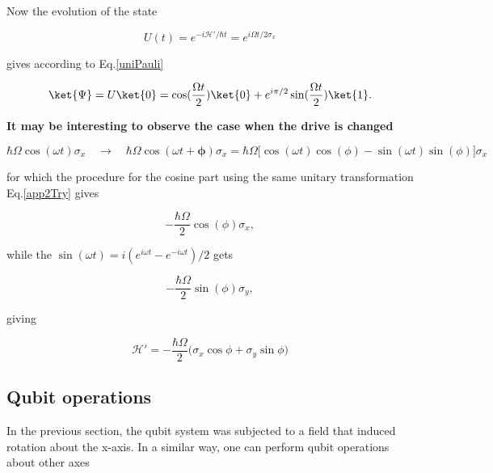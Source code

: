   Now the evolution of the state 
  
  \begin{equation}\label{app2Ev}
  	U(t) = e^{-i\mathcal{H'}/\hbar t} = e^{i\Omega t/2\sigma_x}
  \end{equation}
  
  \noindent gives according to Eq.\eqref{uniPauli}
  
  \begin{equation}\label{app2State}
  	\ket{\Psi} = U\ket{0} = \cos(\frac{\Omega t}{2})\ket{0}+e^{i\pi/2}\sin(\frac{\Omega t}{2})\ket{1}.
  \end{equation}
  
  \begin{figure}
  \end{figure}
  
  \noindent \textbf{It may be interesting to observe the case when the drive is changed}
  
  \begin{equation}\label{app2NewPhase}
  	\hbar\Omega\cos(\omega t)\sigma_x \quad \rightarrow \quad \hbar\Omega\cos(\omega t+\mathbf{\phi})\sigma_x = \hbar\Omega\bigg[\cos(\omega t)\cos(\phi)-\sin(\omega t)\sin(\phi)\bigg]\sigma_x
  \end{equation}
  
  \noindent for which the procedure for the cosine part using the same unitary transformation Eq.\eqref{app2Try} gives
  
  \begin{equation}\label{app2Cos}
  	-\frac{\hbar\Omega}{2}\cos(\phi)\sigma_x,
  \end{equation}
  
  \noindent while the $ \sin(\omega t) = i(e^{i\omega t}-e^{-i\omega t})/2 $ gets
  
  \begin{equation}\label{app2Sin}
  	-\frac{\hbar\Omega}{2}\sin(\phi)\sigma_y,
  \end{equation}
  
  \noindent giving
  
  \begin{equation}\label{app2Combined}
  	\mathcal{H'} = -\frac{\hbar\Omega}{2}\bigg(\sigma_x\cos\phi+\sigma_y\sin\phi\bigg)
  \end{equation}
  
 
 \subsection{Qubit operations}
  In the previous section, the qubit system was subjected to a field that induced rotation about the x-axis. In a similar way, one can perform qubit operations about other axes 
  
